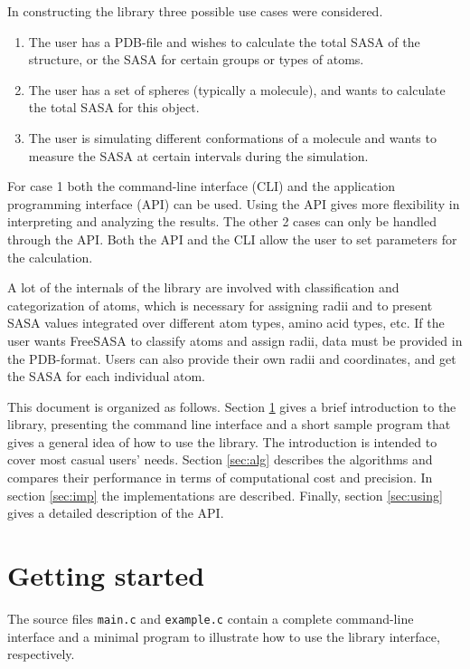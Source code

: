 \documentclass[a4paper,11pt]{article}
\begin{document}
In constructing the library three possible use cases were considered. 
\begin{enumerate}
\item The user has a PDB-file and wishes to calculate the total SASA of
  the structure, or the SASA for certain groups or types of atoms.
\item The user has a set of spheres (typically a molecule), and wants
  to calculate the total SASA for this object.
\item The user is simulating different conformations of a molecule and
  wants to measure the SASA at certain intervals during the simulation.
\end{enumerate}
For case 1 both the command-line interface (CLI) and the application
programming interface (API) can be used. Using the API gives more
flexibility in interpreting and analyzing the results. The other 2
cases can only be handled through the API. Both the API and the CLI
allow the user to set parameters for the calculation. 

A lot of the internals of the library are involved with classification
and categorization of atoms, which is necessary for assigning radii
and to present SASA values integrated over different atom types, amino
acid types, etc. If the user wants FreeSASA to classify atoms and
assign radii, data must be provided in the PDB-format. Users can also
provide their own radii and coordinates, and get the SASA for each
individual atom.

This document is organized as follows. Section \ref{sec:howto_short}
gives a brief introduction to the library, presenting the command line
interface and a short sample program that gives a general idea of how
to use the library. The introduction is intended to cover most casual
users' needs. Section \ref{sec:alg} describes the algorithms and
compares their performance in terms of computational cost and
precision. In section \ref{sec:imp} the implementations are
described. Finally, section \ref{sec:using} gives a detailed
description of the API.

\section{Getting started}\label{sec:howto_short}

The source files \verb|main.c| and \verb|example.c| contain
a complete command-line interface and a minimal program to illustrate
how to use the library interface, respectively. 
\end{document}
